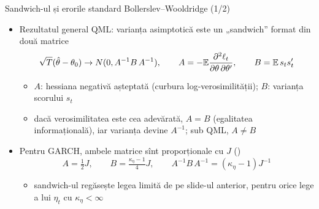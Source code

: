 \begin{frame}{Sandwich-ul și erorile standard Bollerslev--Wooldridge (1/2)}
\itemsize{\small}
\begin{itemize}
    \item Rezultatul general QML: varianța asimptotică este un „sandwich” format din două matrice
    \[ \sqrt T(\hat\theta - \theta_0) \to N(0, A^{-1}B\,A^{-1}), \qquad A = -\mathbb{E}\frac{\partial^2\ell_t}{\partial\theta\,\partial\theta'}, \qquad B = \mathbb{E}\,s_ts_t' \]
    \begin{itemize}
        \item $A$: hessiana negativă așteptată (curbura log-verosimilității); $B$: varianța scorului $s_t$
        \item dacă verosimilitatea este cea adevărată, $A = B$ (egalitatea informațională), iar varianța devine $A^{-1}$; sub QML, $A \ne B$
    \end{itemize}
    \item Pentru GARCH, ambele matrice sînt proporționale cu $J$ ()
    \[ A = \tfrac12J, \qquad B = \tfrac{\kappa_\eta - 1}{4}J, \qquad A^{-1}B\,A^{-1} = (\kappa_\eta - 1)J^{-1} \]
    \begin{itemize}
        \item sandwich-ul regăsește legea limită de pe slide-ul anterior, pentru orice lege a lui $\eta_t$ cu $\kappa_\eta < \infty$
    \end{itemize}
\end{itemize}
\end{frame}

